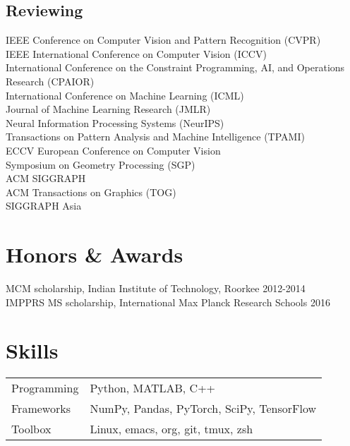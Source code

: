 \documentclass[11pt,letter,sans]{moderncv}
\begin{document}
\subsection{Reviewing}
IEEE Conference on Computer Vision and Pattern Recognition (CVPR) \\
IEEE International Conference on Computer Vision (ICCV) \\
International Conference on the Constraint Programming, AI, and Operations Research (CPAIOR) \\
International Conference on Machine Learning (ICML) \\
Journal of Machine Learning Research (JMLR) \\
Neural Information Processing Systems (NeurIPS) \\
Transactions on Pattern Analysis and Machine Intelligence (TPAMI) \\
ECCV European Conference on Computer Vision \\
Symposium on Geometry Processing (SGP) \\
ACM SIGGRAPH \\
ACM Transactions on Graphics (TOG) \\
SIGGRAPH Asia \\


\section{Honors \& Awards}
    MCM scholarship, Indian Institute of Technology, Roorkee
  \hfill 2012-2014
    \\[0.5mm]
    IMPPRS MS scholarship, International Max Planck Research Schools
  \hfill 2016
    \\[0.5mm]


\section{Skills}
\begin{tabular}{p{1in}p{5in}}
    Programming & Python, MATLAB, C++
 \\
    Frameworks & NumPy, Pandas, PyTorch, SciPy, TensorFlow
 \\
    Toolbox & Linux, emacs, org, git, tmux, zsh
 \\
\end{tabular}
\end{document}
